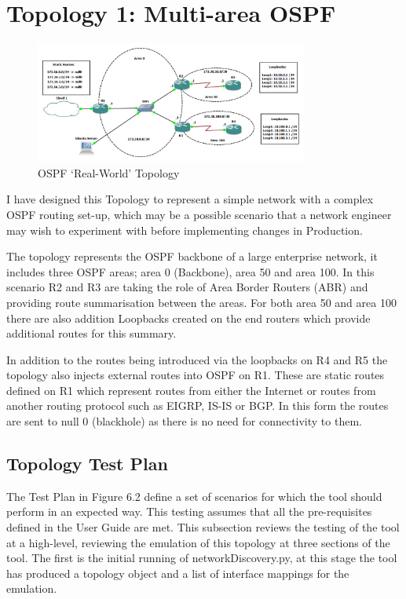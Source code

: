 \documentclass[11pt]{report}
\begin{document}
\section{Topology 1: Multi-area OSPF}

\begin{figure}[h!]
	\caption{OSPF `Real-World' Topology}
	\centering
	\begin{center}
	\includegraphics[width=0.8\textwidth]{Lab-Design.png}
	\end{center}
\end{figure}

I have designed this Topology to represent a simple network with a complex OSPF routing set-up, which may be a possible scenario that a network engineer may wish to experiment with before implementing changes in Production.

The topology represents the OSPF backbone of a large enterprise network, it includes three OSPF areas; area 0 (Backbone), area 50 and area 100. In this scenario R2 and R3 are taking the role of Area Border Routers (ABR) and providing route summarisation between the areas. For both area 50 and area 100 there are also addition Loopbacks created on the end routers which provide additional routes for this summary.

In addition to the routes being introduced via the loopbacks on R4 and R5 the topology also injects external routes into OSPF on R1. These are static routes defined on R1 which represent routes from either the Internet or routes from another routing protocol such as EIGRP, IS-IS or BGP. In this form the routes are sent to null 0 (blackhole) as there is no need for connectivity to them.

\subsection{Topology Test Plan}

The Test Plan in Figure 6.2 define a set of scenarios for which the tool should perform in an expected way. This testing assumes that all the pre-requisites defined in the User Guide are met. This subsection reviews the testing of the tool at a high-level, reviewing the emulation of this topology at three sections of the tool. The first is the initial running of networkDiscovery.py, at this stage the tool has produced a topology object and a list of interface mappings for the emulation.
\end{document}
